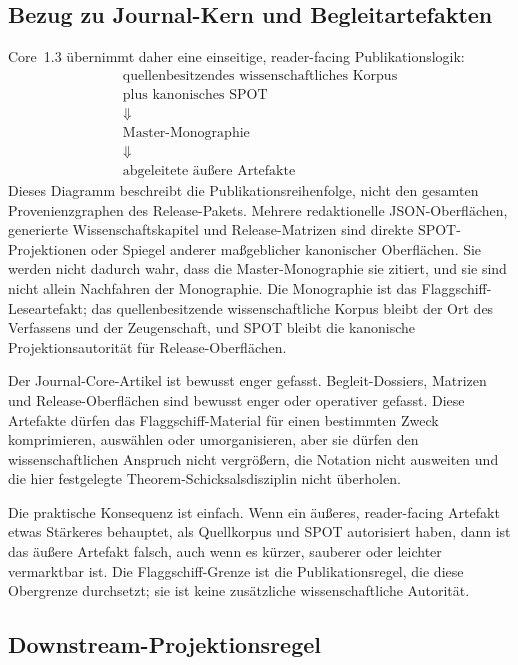 \subsection{Bezug zu Journal-Kern und Begleitartefakten}

Core~1.3 übernimmt daher eine einseitige, reader-facing Publikationslogik:
\[
\begin{gathered}
\text{quellenbesitzendes wissenschaftliches Korpus}\\
\text{plus kanonisches SPOT}\\
\Downarrow\\
\text{Master-Monographie}\\
\Downarrow\\
\text{abgeleitete äußere Artefakte}
\end{gathered}
\]
Dieses Diagramm beschreibt die Publikationsreihenfolge, nicht den gesamten
Provenienzgraphen des Release-Pakets. Mehrere redaktionelle JSON-Oberflächen,
generierte Wissenschaftskapitel und Release-Matrizen sind direkte
SPOT-Projektionen oder Spiegel anderer maßgeblicher kanonischer Oberflächen.
Sie werden nicht dadurch wahr, dass die Master-Monographie sie zitiert, und
sie sind nicht allein Nachfahren der Monographie. Die Monographie ist das
Flaggschiff-Leseartefakt; das quellenbesitzende wissenschaftliche Korpus bleibt
der Ort des Verfassens und der Zeugenschaft, und SPOT bleibt die kanonische
Projektionsautorität für Release-Oberflächen.

Der Journal-Core-Artikel ist bewusst enger gefasst. Begleit-Dossiers,
Matrizen und Release-Oberflächen sind bewusst enger oder operativer gefasst.
Diese Artefakte dürfen das Flaggschiff-Material für einen bestimmten Zweck
komprimieren, auswählen oder umorganisieren, aber sie dürfen den
wissenschaftlichen Anspruch nicht vergrößern, die Notation nicht ausweiten und
die hier festgelegte Theorem-Schicksalsdisziplin nicht überholen.

Die praktische Konsequenz ist einfach. Wenn ein äußeres,
reader-facing Artefakt etwas Stärkeres behauptet, als Quellkorpus und SPOT
autorisiert haben, dann ist das äußere Artefakt falsch, auch wenn es kürzer,
sauberer oder leichter vermarktbar ist. Die Flaggschiff-Grenze ist die
Publikationsregel, die diese Obergrenze durchsetzt; sie ist keine zusätzliche
wissenschaftliche Autorität.

\subsection{Downstream-Projektionsregel}

